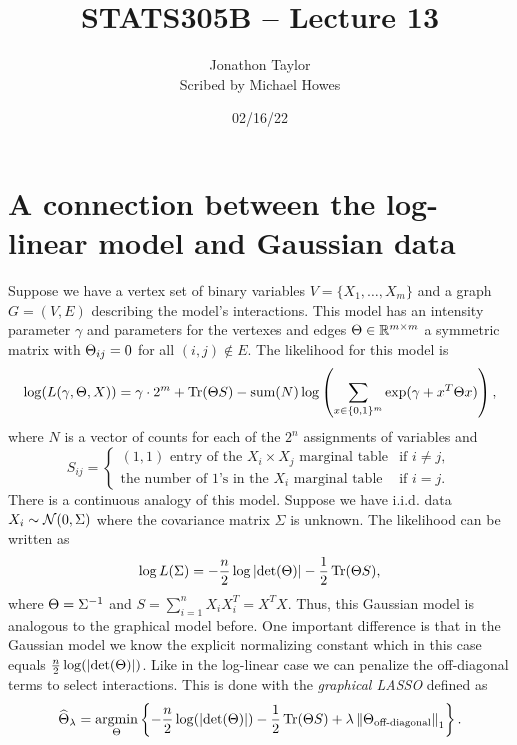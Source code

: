 




\title{STATS305B -- Lecture 13}
\author{Jonathon Taylor\\ Scribed by Michael Howes}
\date{02/16/22}

\pagestyle{fancy}
\fancyhf{}


\maketitle
\tableofcontents

\section{A connection between the log-linear model and Gaussian data}
Suppose we have a vertex set of binary variables $V =\{X_1,\ldots,X_m\}$ and a graph $G=(V,E)$ describing the model's interactions. This model has an intensity parameter $\gamma$ and parameters for the vertexes and edges ${\Theta} \in {\mathbb R}^{m \times m}$ a symmetric matrix with ${\Theta}_{ij}=0$ for all $(i,j)\notin E$. The likelihood for this model is 
\[\log(L(\gamma,{\Theta},X)) = \gamma \cdot 2^m +\operatorname{Tr}({\Theta} S)-\text{sum}(N)\log \left(\sum_{x \in \{0,1\}^m}\exp(\gamma + x^T{\Theta} x)\right),\]
where $N$ is a vector of counts for each of the $2^n$ assignments of variables and 
\[S_{ij} = \begin{cases}
    (1,1) \text{ entry of the $X_i \times X_j$ marginal table} & \text{if } i \neq j,\\
    \text{the number of 1's in the $X_i$ marginal table} & \text{if } i=j.
\end{cases} \]
There is a continuous analogy of this model. Suppose we have i.i.d. data $X_i \sim {{\mathcal{N}}}(0,\Sigma)$ where the covariance matrix $\Sigma$ is unknown. The likelihood can be written as
\[\log L(\Sigma) = -\frac{n}{2}\log {\left\lvert\det({\Theta})\right\rvert} - \frac{1}{2}\operatorname{Tr}({\Theta} S), \]
where ${\Theta} = \Sigma^{-1}$ and $S = \sum_{i=1}^n X_iX_i^T = X^TX$. Thus, this  Gaussian model is analogous to the graphical model before. One important difference is that in the Gaussian model we know the explicit normalizing constant which in this case equals $\frac{n}{2}\log({\left\lvert\det({\Theta})\right\rvert})$. Like in the log-linear case we can penalize the off-diagonal terms to select interactions. This is done with the \emph{graphical LASSO} defined as 
\[\widehat{{\Theta}}_\lambda = \operatorname*{argmin}_{\Theta} \left\{-\frac{n}{2}\log({\left\lvert\det({\Theta})\right\rvert}) - \frac{1}{2}\operatorname{Tr}({\Theta} S) + \lambda \left\|{\Theta}_{\text{off-diagonal}}\right\|_1\right\}. \]
